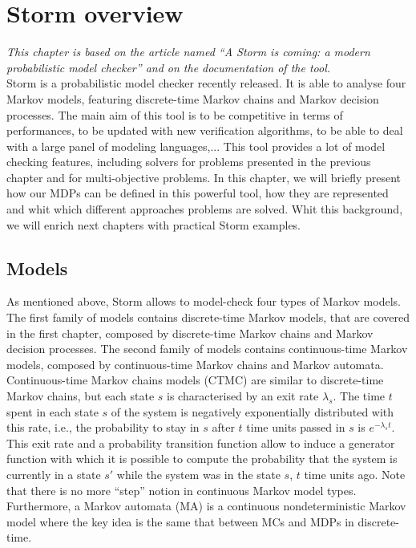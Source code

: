 \chapter{Storm overview}
\textit{This chapter is based on the article named ``A Storm is coming: a modern probabilistic model checker'' \cite{storm1} and on the documentation of the tool.} \\

Storm is a probabilistic model checker recently released. It is able to analyse
four Markov models, featuring discrete-time Markov chains and Markov decision processes. The main aim of this tool is to be competitive in terms of performances, to be updated with new verification algorithms, to be able to
deal with a large panel of modeling languages,... This tool provides %
a lot of model checking features, including solvers for problems presented in the previous chapter and
for multi-objective problems. In this chapter, we will briefly present how our MDPs can be defined in this powerful tool, how they are represented and whit which different approaches problems are solved.
Whit this background, we will enrich next chapters with practical Storm examples.

\section{Models}
As mentioned above, Storm allows to model-check four types of Markov models.
The first family of models contains discrete-time Markov models, that are covered in the first chapter, composed by
discrete-time Markov chains and Markov decision processes.
The second family of models contains continuous-time Markov models, composed by continuous-time Markov chains and Markov automata. \\

Continuous-time Markov chains models (CTMC) \cite{maro} are similar to discrete-time Markov chains, but each state $s$ is
characterised by an exit rate $\lambda_s$.
The time $t$ spent in each state $s$ of the system is negatively exponentially distributed with this rate, i.e., the probability to stay in $s$ after $t$ time units passed in $s$ is $e^{- \lambda_s t}$.
This exit rate and a probability transition function allow to induce a generator
function with which it is possible to compute the probability
that the system is currently in a state $s'$ while the system was in the state $s$, $t$ time units ago. Note that there is no more ``step'' notion in continuous
Markov model types. Furthermore, a Markov automata (MA) is a continuous nondeterministic Markov model where the key idea is the same that between MCs and MDPs in discrete-time. \\

